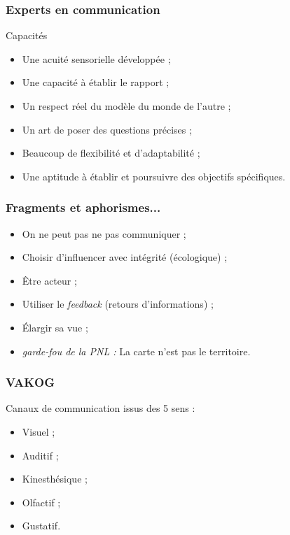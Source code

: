 \documentclass{beamer}
\begin{document}
\begin{frame}[t]\frametitle{Experts en communication}
	\begin{block}{Capacités}
		\begin{itemize}
			\item Une acuité sensorielle développée ;
			\item Une capacité à établir le rapport ;
			\item Un respect réel du modèle du monde de l'autre ;
			\item Un art de poser des questions précises ;
			\item Beaucoup de flexibilité et d'adaptabilité ;
			\item Une aptitude à établir et poursuivre des objectifs spécifiques.
		\end{itemize}
	\end{block}
\end{frame}

\begin{frame}[t]\frametitle{Fragments et aphorismes...}
	\begin{itemize}
		\item On ne peut pas ne pas communiquer ;
		\item Choisir d'influencer avec intégrité (écologique) ;
		\item Être acteur ;
		\item Utiliser le \emph{feedback} (retours d'informations) ;
		\item Élargir sa vue ;
		\item \emph{garde-fou de la PNL :} La carte n'est pas le territoire.
	\end{itemize}
\end{frame}

\begin{frame}[t]\frametitle{VAKOG}
	Canaux de communication issus des 5 sens :
	\begin{itemize}
		\item Visuel ;
		\item Auditif ;
		\item Kinesthésique ;
		\item Olfactif ;
		\item Gustatif.  
	\end{itemize}
\end{frame}
\end{document}
